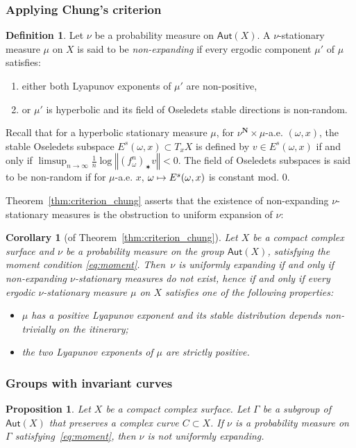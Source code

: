 \documentclass[11pt]{article}
\newcommand{\Subsubsection}{\subsubsection}
\newenvironment{enumeratei}
{\bgroup\def\theenumi{\roman{enumi}}\def\theenumii{\arabic{enumii}}\begin{enumerate}}
{\end{enumerate}\egroup}
\newcommand\mto{\mathchoice{\longmapsto}{\mapsto}{\mapsto}{\mapsto}}
\newcommand{\norm}[1]{{\left\Vert#1\right\Vert}}
\newcommand{\unsur}[1]{\frac{1}{#1}}
\def\N{\mathbf{N}}
\newcommand\Aut{\mathsf{Aut}}
\theoremstyle{plain}
\newtheorem{cor}[thm]{Corollary}
\newtheorem{pro}[thm]{Proposition}
\theoremstyle{definition}
\newtheorem{defi}[thm]{Definition}
\numberwithin{equation}{section}
\begin{document}
\Subsubsection{Applying Chung's criterion}

\begin{defi}\label{defi:non_expanding_measure}
Let $\nu$ be a probability measure on $\Aut(X)$. A
$\nu$-stationary measure $\mu$ on $X$ is said to be
\emph{non-expanding} if
every ergodic component $\mu'$ of $\mu$ satisfies:
\begin{enumeratei}
\item\label{defi:non_expanding_measurei} either both Lyapunov exponents of $\mu'$ are non-positive,
\item\label{defi:non_expanding_measureii} or $\mu'$ is hyperbolic and its field of Oseledets stable directions is non-random.
\end{enumeratei}
\end{defi}

Recall that for a hyperbolic stationary measure $\mu$, for $\nu^\N\times \mu$-a.e. $(\omega, x)$, the stable Oseledets subspace $E^s(\omega, x)\subset T_xX$ is defined by
$v\in E^s(\omega, x)$ if and only if $\limsup_{n\to\infty} \unsur{n}\log \norm{(f_\omega^n)_\varstar v}<0$. The field of Oseledets subspaces is said to be non-random if for $\mu$-a.e. $x$,
$\omega\mto E^s(\omega, x)$ is constant mod. $0$.

Theorem~\ref{thm:criterion_chung} asserts that the existence
of non-expanding $\nu$-stationary measures is the obstruction to uniform expansion of $\nu$:

\begin{cor}[of Theorem~\ref{thm:criterion_chung}] \label{cor:criterion_chung}
Let $X$ be a compact complex surface and $\nu$ be a probability measure on the group $\Aut(X)$, satisfying the moment condition \eqref{eq:moment}.
Then~$\nu$ is uniformly expanding if
and only if non-expanding $\nu$-stationary measures do not exist, hence
if and only if every ergodic $\nu$-stationary measure $\mu$ on $X$ satisfies one of the following properties:
\begin{itemize}
\item $\mu$ has a positive Lyapunov exponent and its stable distribution depends non-trivially on the itinerary;
\item the two Lyapunov exponents of $\mu$ are strictly positive.
\end{itemize} \end{cor}

\Subsubsection{Groups with invariant curves}

\begin{pro}\label{pro:invariant_curve}
Let $X$ be a compact complex surface. Let
$\Gamma$ be a subgroup of $\Aut(X)$ that preserves a complex curve $C\subset X$. If $\nu$ is a probability measure on $\Gamma$ satisfying~\eqref{eq:moment}, then $\nu$ is not uniformly expanding.
\end{pro}
\end{document}

